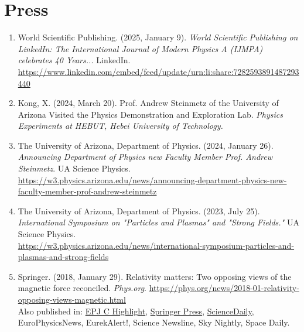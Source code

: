 \documentclass[11pt]{article}
\begin{document}
\section*{Press}
\begin{enumerate}[leftmargin=*,nosep]
    \item World Scientific Publishing. (2025, January 9). \textit{World Scientific Publishing on LinkedIn: The International Journal of Modern Physics A (IJMPA) celebrates 40 Years...} LinkedIn.\\ \href{https://www.linkedin.com/embed/feed/update/urn:li:share:7282593891487293440}{https://www.linkedin.com/embed/feed/update/urn:li:share:7282593891487293440}
    \item Kong, X. (2024, March 20). Prof. Andrew Steinmetz of the University of Arizona Visited the Physics Demonstration and Exploration Lab. \textit{Physics Experiments at HEBUT, Hebei University of Technology.}
    \item The University of Arizona, Department of Physics. (2024, January 26). \textit{Announcing Department of Physics new Faculty Member Prof. Andrew Steinmetz}. UA Science Physics.\\ {\footnotesize\href{https://w3.physics.arizona.edu/news/announcing-department-physics-new-faculty-member-prof-andrew-steinmetz}{https://w3.physics.arizona.edu/news/announcing-department-physics-new-faculty-member-prof-andrew-steinmetz}}
    \item The University of Arizona, Department of Physics. (2023, July 25). \textit{International Symposium on "Particles and Plasmas" and "Strong Fields."} UA Science Physics.\\ {\footnotesize\href{https://w3.physics.arizona.edu/news/international-symposium-particles-and-plasmas-and-strong-fields}{https://w3.physics.arizona.edu/news/international-symposium-particles-and-plasmas-and-strong-fields}}
    \item Springer. (2018, January 29). Relativity matters: Two opposing views of the magnetic force reconciled. \textit{Phys.org}. \href{https://phys.org/news/2018-01-relativity-opposing-views-magnetic.html}{https://phys.org/news/2018-01-relativity-opposing-views-magnetic.html}\\[0.3em]
    Also published in: \href{https://www.epj.org/epjc-news/1422-epjc-highlight-relativity-matters-two-opposing-views-of-the-magnetic-force-reconciled}{EPJ C Highlight}, \href{https://www.springer.com/gp/about-springer/media/research-news/all-english-research-news/relativity-matters--two-opposing-views-of-the-magnetic-force-reconciled/15417658}{Springer Press}, \href{https://www.sciencedaily.com/releases/2018/01/180129131327.htm}{ScienceDaily}, EuroPhysicsNews, EurekAlert!, Science Newsline, Sky Nightly, Space Daily.
\end{enumerate}
\end{document}
